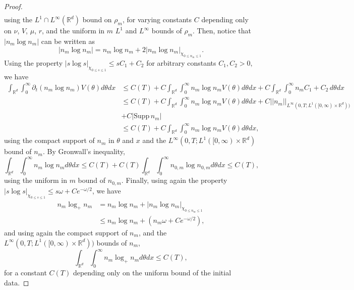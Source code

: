 \documentclass[10pt,a4paper]{amsart}
\def\R{\mathbb R}
\def\supp{\mathrm{Supp}\,}
\begin{document}
\begin{proof}
\begin{align*}
   \end{align*}
   using the $L^1 \cap L^\infty(\R^d)$ bound on $\rho_m$, for varying constants $C$ depending only on $\nu$, $V$, $\mu$, $r$, and the uniform in $m$ $L^1$ and $L^\infty$ bounds of $\rho_m.$ 
   Then, notice that $|n_m\log n_m|$ can be written as
   $$
   |n_m \log n_m|=n_m \log n_m +2|n_m \log n_m|_{\chi_{0\leq n_m \leq 1}}.
   $$
   Using the property $|s\log s|_{\chi_{0\leq s \leq 1}}\leq sC_1+C_2$ for arbitrary constants $C_1, C_2>0,$ we have 
   \begin{align*}
   \int_{\R^d}\int_{0}^{\infty}\partial_t (n_m \log n_m)V(\theta)d\theta dx &\leq C(T)+C\int_{\R^d}\int_{0}^{\infty}n_m \log n_m V(\theta)d\theta dx + C\int_{\R^d}\int_{0}^{\infty}n_m C_1 + C_2\,d\theta dx \\
   &\leq C(T)+C\int_{\R^d}\int_{0}^{\infty}n_m \log n_m V(\theta)d\theta dx +C||n_m||_{L^\infty(0,T;L^1([0,\infty)\times \R^d))}\\&+C|\supp n_m|\\
   &\leq C(T)+C\int_{\R^d}\int_{0}^{\infty}n_m \log n_m V(\theta)d\theta dx,
   \end{align*}
   using the compact support of $n_m$ in $\theta$ and $x$ and the $L^\infty(0,T;L^1( [0,\infty)\times \R^d)$ bound of $n_m$. By Gronwall's inequality,
   $$
   \int_{\R^d}\int_{0}^{\infty}n_m \log n_m d\theta dx \leq C(T)+C(T)\int_{\R^d}\int_{0}^{\infty}n_{0,m}\log n_{0,m}d\theta dx\leq C(T),
   $$
   using the uniform in $m$ bound of $n_{0,m}.$ Finally, using again the property $|s\log s|_{\chi_{0\leq s \leq 1}}\leq s\omega +Ce^{-\omega/2}$, we have
   \begin{align*}
       n_m \log_+ n_m& =n_m\log n_m+|n_m \log n_m|_{\chi_{0\leq n_m \leq 1}}\\
       &\leq n_m \log n_m +(n_m \omega +Ce^{-\omega/2}),
   \end{align*}
   and using again the compact support of $n_m$, and the $L^\infty(0,T;L^1([0,\infty)\times \R^d))$ bounds of $n_m$, 
   $$
   \int_{\R^d}\int_{0}^{\infty}n_m \log_+ n_m d\theta dx \leq C(T),
   $$
   for a constant $C(T)$ depending only on the uniform bound of the initial data.
 \end{proof}
\end{document}
